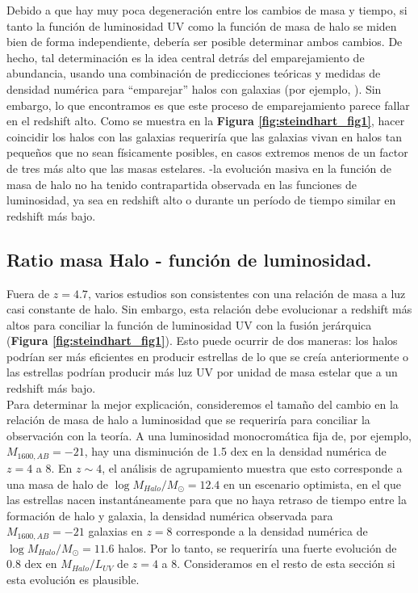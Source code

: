 \documentclass{article}
\begin{document}
Debido a que hay muy poca degeneración entre los cambios de masa y tiempo, si tanto la función de luminosidad UV como la función de masa de halo se miden bien de forma independiente, debería ser posible determinar ambos cambios. De hecho, tal determinación es la idea central detrás del emparejamiento de abundancia, usando una combinación de predicciones teóricas y medidas de densidad numérica para ``emparejar'' halos con galaxias (por ejemplo, \cite{finkelstein2015increasing}). Sin embargo, lo que encontramos es que este proceso de emparejamiento parece fallar en el redshift alto. Como se muestra en la \textbf{Figura \ref{fig:steindhart_fig1}}, hacer coincidir los halos con las galaxias requeriría que las galaxias vivan en halos tan pequeños que no sean físicamente posibles, en casos extremos menos de un factor de tres más alto que las masas estelares. -la evolución masiva en la función de masa de halo no ha tenido contrapartida observada en las funciones de luminosidad, ya sea en redshift alto o durante un período de tiempo similar en redshift más bajo.

\subsection{Ratio masa Halo - función de luminosidad.} \label{sec:ratio_halo_lum}
Fuera de $z = 4.7$, varios estudios son consistentes con una relación de masa a luz casi constante de halo. Sin embargo, esta relación debe evolucionar a redshift más altos para conciliar la función de luminosidad UV con la fusión jerárquica (\textbf{Figura \ref{fig:steindhart_fig1}}). Esto puede ocurrir de dos maneras: los halos podrían ser más eficientes en producir estrellas de lo que se creía anteriormente o las estrellas podrían producir más luz UV por unidad de masa estelar que a un redshift más bajo.\\

Para determinar la mejor explicación, consideremos el tamaño del cambio en la relación de masa de halo a luminosidad que se requeriría para conciliar la observación con la teoría. A una luminosidad monocromática fija de, por ejemplo, $M_{1600, AB} = -21$, hay una disminución de 1.5 dex en la densidad numérica de $z = 4$ a 8. En $z\sim 4$, el análisis de agrupamiento muestra que esto corresponde a una masa de halo de $\log M_{Halo} / M_\odot = 12.4$ en un escenario optimista, en el que las estrellas nacen instantáneamente para que no haya retraso de tiempo entre la formación de halo y galaxia, la densidad numérica observada para $M_{1600, AB} = -21$ galaxias en $z = 8$ corresponde a la densidad numérica de $\log M_{Halo} / M_\odot = 11.6$ halos. Por lo tanto, se requeriría una fuerte evolución de 0.8 dex en $M_{Halo} / L_{UV}$ de $z = 4$ a 8. Consideramos en el resto de esta sección si esta evolución es plausible.
\end{document}
